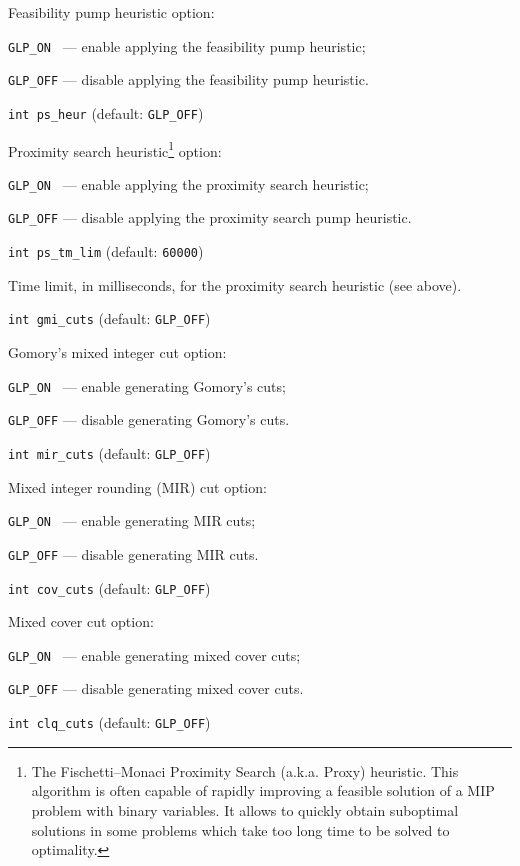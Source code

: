 Feasibility pump heuristic option:

\verb|GLP_ON | --- enable applying the feasibility pump heuristic;

\verb|GLP_OFF| --- disable applying the feasibility pump heuristic.

\bigskip

{\tt int ps\_heur} (default: {\tt GLP\_OFF})

Proximity search heuristic\footnote{The Fischetti--Monaci Proximity
Search (a.k.a. Proxy) heuristic. This algorithm is often capable of
rapidly improving a feasible solution of a MIP problem with binary
variables. It allows to quickly obtain suboptimal solutions in some
problems which take too long time to be solved to optimality.} option:

\verb|GLP_ON | --- enable applying the proximity search heuristic;

\verb|GLP_OFF| --- disable applying the proximity search pump heuristic.

\bigskip

{\tt int ps\_tm\_lim} (default: {\tt 60000})

Time limit, in milliseconds, for the proximity search heuristic (see
above).

\bigskip

{\tt int gmi\_cuts} (default: {\tt GLP\_OFF})

Gomory's mixed integer cut option:

\verb|GLP_ON | --- enable generating Gomory's cuts;

\verb|GLP_OFF| --- disable generating Gomory's cuts.

\bigskip

{\tt int mir\_cuts} (default: {\tt GLP\_OFF})

Mixed integer rounding (MIR) cut option:

\verb|GLP_ON | --- enable generating MIR cuts;

\verb|GLP_OFF| --- disable generating MIR cuts.

\bigskip

{\tt int cov\_cuts} (default: {\tt GLP\_OFF})

Mixed cover cut option:

\verb|GLP_ON | --- enable generating mixed cover cuts;

\verb|GLP_OFF| --- disable generating mixed cover cuts.

\bigskip

{\tt int clq\_cuts} (default: {\tt GLP\_OFF})

